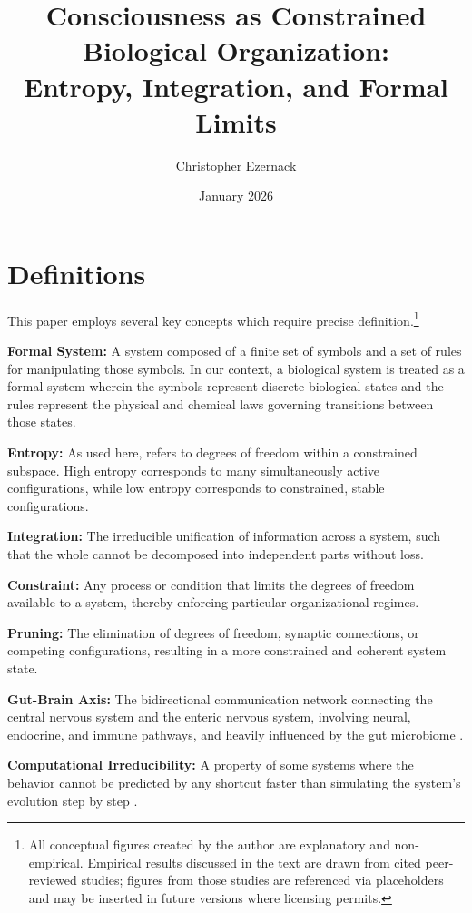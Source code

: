 \documentclass[12pt,letterpaper]{article}
\title{\vspace{-1in}\textbf{Consciousness as Constrained Biological Organization:\\[0.5\baselineskip]Entropy, Integration, and Formal Limits}}
\author{Christopher Ezernack}
\date{January 2026}
\begin{document}
\maketitle
\thispagestyle{empty}



\section*{Definitions}

This paper employs several key concepts which require precise definition.\footnote{All conceptual figures created by the author are explanatory and non-empirical. Empirical results discussed in the text are drawn from cited peer-reviewed studies; figures from those studies are referenced via placeholders and may be inserted in future versions where licensing permits.}

\textbf{Formal System:} A system composed of a finite set of symbols and a set of rules for manipulating those symbols. In our context, a biological system is treated as a formal system wherein the symbols represent discrete biological states and the rules represent the physical and chemical laws governing transitions between those states.

\textbf{Entropy:} As used here, refers to degrees of freedom within a constrained subspace. High entropy corresponds to many simultaneously active configurations, while low entropy corresponds to constrained, stable configurations.

\textbf{Integration:} The irreducible unification of information across a system, such that the whole cannot be decomposed into independent parts without loss.

\textbf{Constraint:} Any process or condition that limits the degrees of freedom available to a system, thereby enforcing particular organizational regimes.

\textbf{Pruning:} The elimination of degrees of freedom, synaptic connections, or competing configurations, resulting in a more constrained and coherent system state.

\textbf{Gut-Brain Axis:} The bidirectional communication network connecting the central nervous system and the enteric nervous system, involving neural, endocrine, and immune pathways, and heavily influenced by the gut microbiome \cite{cryan2012}.

\textbf{Computational Irreducibility:} A property of some systems where the behavior cannot be predicted by any shortcut faster than simulating the system's evolution step by step \cite{wolfram2002}.
\end{document}
